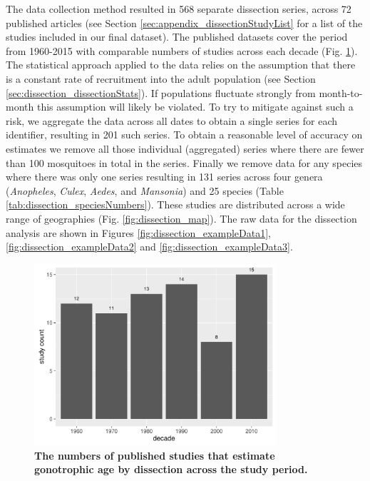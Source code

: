 \documentclass[12pt]{article}
\begin{document}
{The data collection method resulted in 568 separate dissection series, across 72 published articles (see Section \ref{sec:appendix_dissectionStudyList} for a list of the studies included in our final dataset). The published datasets cover the period from 1960-2015 with comparable numbers of studies across each decade (Fig. \ref{fig:dissection_timeSeries}). The statistical approach applied to the data relies on the assumption that there is a constant rate of recruitment into the adult population (see Section \ref{sec:dissection_dissectionStats}). If populations fluctuate strongly from month-to-month this assumption will likely be violated. To try to mitigate against such a risk, we aggregate the data across all dates to obtain a single series for each identifier, resulting in 201 such series. To obtain a reasonable level of accuracy on estimates we remove all those individual (aggregated) series where there are fewer than 100 mosquitoes in total in the series. Finally we remove data for any species where there was only one series resulting in 131 series across four genera (\textit{Anopheles}, \textit{Culex}, \textit{Aedes}, and \textit{Mansonia}) and 25 species (Table \ref{tab:dissection_speciesNumbers}). These studies are distributed across a wide range of geographies (Fig. \ref{fig:dissection_map}). The raw data for the dissection analysis are shown in Figures \ref{fig:dissection_exampleData1}, \ref{fig:dissection_exampleData2} and \ref{fig:dissection_exampleData3}.


\begin{figure}[ht]
	\centerline{\includegraphics[width=0.8\textwidth]{./Figure_files/dissection_timeSeries.pdf}}
	\caption{\textbf{The numbers of published studies that estimate gonotrophic age by dissection across the study period.}}\label{fig:dissection_timeSeries}
\end{figure}


}
\end{document}
